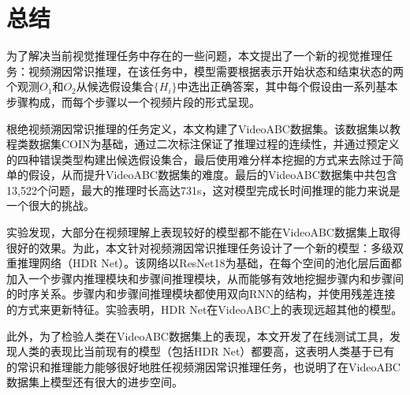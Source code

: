 
\chapter{总结}\label{cha:close}
为了解决当前视觉推理任务中存在的一些问题，本文提出了一个新的视觉推理任务：视频溯因常识推理，在该任务中，模型需要根据表示开始状态和结束状态的两个观测$O_1$和$O_2$从候选假设集合$\{H_i\}$中选出正确答案，其中每个假设由一系列基本步骤构成，而每个步骤以一个视频片段的形式呈现。

根绝视频溯因常识推理的任务定义，本文构建了VideoABC数据集。该数据集以教程类数据集COIN\cite{tang2019coin}为基础，通过二次标注保证了推理过程的连续性，并通过预定义的四种错误类型构建出候选假设集合，最后使用难分样本挖掘的方式来去除过于简单的假设，从而提升VideoABC数据集的难度。最后的VideoABC数据集中共包含13,522个问题，最大的推理时长高达731s，这对模型完成长时间推理的能力来说是一个很大的挑战。

实验发现，大部分在视频理解上表现较好的模型都不能在VideoABC数据集上取得很好的效果。为此，本文针对视频溯因常识推理任务设计了一个新的模型：多级双重推理网络（HDR Net）。该网络以ResNet18\cite{he2016deep}为基础，在每个空间的池化层后面都加入一个步骤内推理模块和步骤间推理模块，从而能够有效地挖掘步骤内和步骤间的时序关系。步骤内和步骤间推理模块都使用双向RNN的结构，并使用残差连接的方式来更新特征。实验表明，HDR Net在VideoABC上的表现远超其他的模型。

此外，为了检验人类在VideoABC数据集上的表现，本文开发了在线测试工具，发现人类的表现比当前现有的模型（包括HDR Net）都要高，这表明人类基于已有的常识和推理能力能够很好地胜任视频溯因常识推理任务，也说明了在VideoABC数据集上模型还有很大的进步空间。